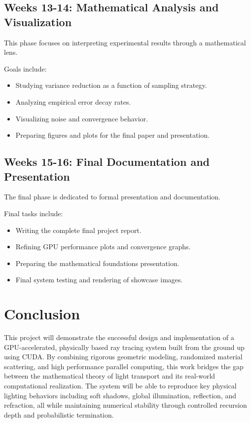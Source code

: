 \documentclass[11pt]{article}
\begin{document}
\subsection*{Weeks 13-14: Mathematical Analysis and Visualization}

This phase focuses on interpreting experimental results through a mathematical lens.

Goals include:
\begin{itemize}
    \item Studying variance reduction as a function of sampling strategy.
    \item Analyzing empirical error decay rates.
    \item Visualizing noise and convergence behavior.
    \item Preparing figures and plots for the final paper and presentation.
\end{itemize}

\subsection*{Weeks 15-16: Final Documentation and Presentation}

The final phase is dedicated to formal presentation and documentation.

Final tasks include:
\begin{itemize}
    \item Writing the complete final project report.
    \item Refining GPU performance plots and convergence graphs.
    \item Preparing the mathematical foundations presentation.
    \item Final system testing and rendering of showcase images.
\end{itemize}




\section{Conclusion}

This project will demonstrate the successful design and implementation of a GPU-accelerated, physically based ray tracing system built from the ground up using CUDA. By combining rigorous geometric modeling, randomized material scattering, and high performance parallel computing, this work bridges the gap between the mathematical theory of light transport and its real-world computational realization. The system will be able to reproduce key physical lighting behaviors including soft shadows, global illumination, reflection, and refraction, all while maintaining numerical stability through controlled recursion depth and probabilistic termination.
\end{document}
